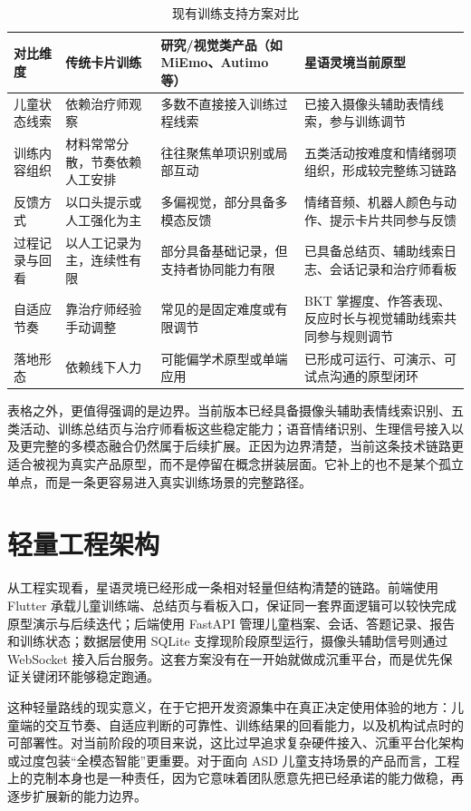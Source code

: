 \begin{table}[H]
\centering
\caption{现有训练支持方案对比}
\small
\begin{tabularx}{0.98\textwidth}{>{\raggedright\arraybackslash}p{} >{\raggedright\arraybackslash}p{} >{\raggedright\arraybackslash}p{} X}
\toprule
对比维度 & 传统卡片训练 & 研究/视觉类产品（如 MiEmo、Autimo 等） & 星语灵境当前原型 \\
\midrule
儿童状态线索 & 依赖治疗师观察 & 多数不直接接入训练过程线索 & 已接入摄像头辅助表情线索，参与训练调节 \\
训练内容组织 & 材料常常分散，节奏依赖人工安排 & 往往聚焦单项识别或局部互动 & 五类活动按难度和情绪弱项组织，形成较完整练习链路 \\
反馈方式 & 以口头提示或人工强化为主 & 多偏视觉，部分具备多模态反馈 & 情绪音频、机器人颜色与动作、提示卡片共同参与反馈 \\
过程记录与回看 & 以人工记录为主，连续性有限 & 部分具备基础记录，但支持者协同能力有限 & 已具备总结页、辅助线索日志、会话记录和治疗师看板 \\
自适应节奏 & 靠治疗师经验手动调整 & 常见的是固定难度或有限调节 & BKT 掌握度、作答表现、反应时长与视觉辅助线索共同参与规则调节 \\
落地形态 & 依赖线下人力 & 可能偏学术原型或单端应用 & 已形成可运行、可演示、可试点沟通的原型闭环 \\
\bottomrule
\end{tabularx}
\end{table}

表格之外，更值得强调的是边界。当前版本已经具备摄像头辅助表情线索识别、五类活动、训练总结页与治疗师看板这些稳定能力；语音情绪识别、生理信号接入以及更完整的多模态融合仍然属于后续扩展。正因为边界清楚，当前这条技术链路更适合被视为真实产品原型，而不是停留在概念拼装层面。它补上的也不是某个孤立单点，而是一条更容易进入真实训练场景的完整路径。

\section{轻量工程架构}
从工程实现看，星语灵境已经形成一条相对轻量但结构清楚的链路。前端使用 Flutter 承载儿童训练端、总结页与看板入口，保证同一套界面逻辑可以较快完成原型演示与后续迭代；后端使用 FastAPI 管理儿童档案、会话、答题记录、报告和训练状态；数据层使用 SQLite 支撑现阶段原型运行，摄像头辅助信号则通过 WebSocket 接入后台服务。这套方案没有在一开始就做成沉重平台，而是优先保证关键闭环能够稳定跑通。

这种轻量路线的现实意义，在于它把开发资源集中在真正决定使用体验的地方：儿童端的交互节奏、自适应判断的可靠性、训练结果的回看能力，以及机构试点时的可部署性。对当前阶段的项目来说，这比过早追求复杂硬件接入、沉重平台化架构或过度包装“全模态智能”更重要。对于面向 ASD 儿童支持场景的产品而言，工程上的克制本身也是一种责任，因为它意味着团队愿意先把已经承诺的能力做稳，再逐步扩展新的能力边界。

